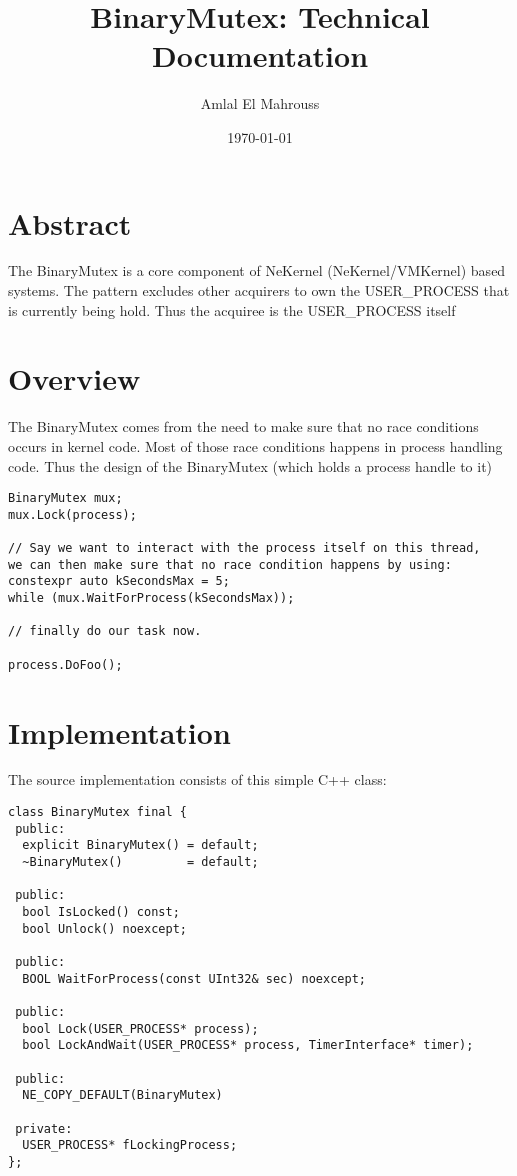 \documentclass{article}
\title{BinaryMutex: Technical Documentation}
\author{Amlal El Mahrouss}
\date{\today}
\begin{document}
\maketitle

\section{Abstract}

{The BinaryMutex is a core component of NeKernel (NeKernel/VMKernel) based systems. The pattern excludes other acquirers to own the USER\_PROCESS that is currently being hold. Thus the acquiree is the USER\_PROCESS itself}

\section{Overview}

{The BinaryMutex comes from the need to make sure that no race conditions occurs in kernel code. Most of those race conditions happens in process handling code. Thus the design of the BinaryMutex (which holds a process handle to it)}

\begin{verbatim}
BinaryMutex mux;
mux.Lock(process);

// Say we want to interact with the process itself on this thread, 
we can then make sure that no race condition happens by using:
constexpr auto kSecondsMax = 5;
while (mux.WaitForProcess(kSecondsMax));

// finally do our task now.

process.DoFoo();
\end{verbatim}

\section{Implementation}

The source implementation consists of this simple C++ class:

\begin{verbatim}
class BinaryMutex final {
 public:
  explicit BinaryMutex() = default;
  ~BinaryMutex()         = default;

 public:
  bool IsLocked() const;
  bool Unlock() noexcept;

 public:
  BOOL WaitForProcess(const UInt32& sec) noexcept;

 public:
  bool Lock(USER_PROCESS* process);
  bool LockAndWait(USER_PROCESS* process, TimerInterface* timer);

 public:
  NE_COPY_DEFAULT(BinaryMutex)

 private:
  USER_PROCESS* fLockingProcess;
};
\end{verbatim}
\end{document}
